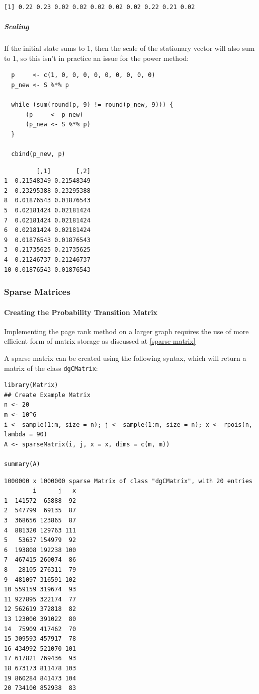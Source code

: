 \documentclass[11pt]{article}
\begin{document}
\begin{verbatim}
[1] 0.22 0.23 0.02 0.02 0.02 0.02 0.02 0.22 0.21 0.02
\end{verbatim}

\subparagraph{Scaling}
\label{scaling}
If the initial state sums to 1, then the scale of the stationary
vector will also sum to 1, so this isn't in practice an issue for the power method:

\begin{verbatim}
  p     <- c(1, 0, 0, 0, 0, 0, 0, 0, 0, 0)
  p_new <- S %*% p

  while (sum(round(p, 9) != round(p_new, 9))) {
      (p     <- p_new)
      (p_new <- S %*% p)
  }

  cbind(p_new, p)
\end{verbatim}

\begin{verbatim}
         [,1]       [,2]
1  0.21548349 0.21548349
2  0.23295388 0.23295388
8  0.01876543 0.01876543
5  0.02181424 0.02181424
7  0.02181424 0.02181424
6  0.02181424 0.02181424
9  0.01876543 0.01876543
3  0.21735625 0.21735625
4  0.21246737 0.21246737
10 0.01876543 0.01876543
\end{verbatim}

\subsubsection{Sparse Matrices}
\label{sec:org1aa2d1c}
\paragraph{Creating the Probability Transition Matrix}
\label{sec:org04def23}
Implementing the page rank method on a larger graph requires the use of more
efficient form of matrix storage as discussed at \ref{sparse-matrix}

A sparse matrix can be created using the following syntax, which will return a
matrix of the class \texttt{dgCMatrix}:

\begin{verbatim}
library(Matrix)
## Create Example Matrix
n <- 20
m <- 10^6
i <- sample(1:m, size = n); j <- sample(1:m, size = n); x <- rpois(n, lambda = 90)
A <- sparseMatrix(i, j, x = x, dims = c(m, m))

summary(A)
\end{verbatim}

\begin{verbatim}
1000000 x 1000000 sparse Matrix of class "dgCMatrix", with 20 entries
        i      j   x
1  141572  65888  92
2  547799  69135  87
3  368656 123865  87
4  881320 129763 111
5   53637 154979  92
6  193808 192238 100
7  467415 260074  86
8   28105 276311  79
9  481097 316591 102
10 559159 319674  93
11 927895 322174  77
12 562619 372818  82
13 123000 391022  80
14  75909 417462  70
15 309593 457917  78
16 434992 521070 101
17 617821 769436  93
18 673173 811478 103
19 860284 841473 104
20 734100 852938  83
\end{verbatim}
\end{document}
